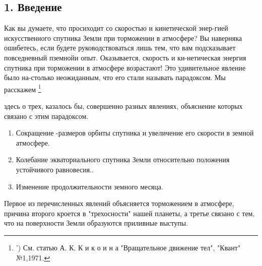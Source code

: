\fontsize{14}{9}\selectfont
\begin{multicols}{2}

\leftskip=0.1cm \rightskip=1cm
\fontsize{14}{15}\selectfont
\begin{minipage}{8.5cm}
\begin{center}
\subsection*{1. Введение}
\end{center}
 \hspace{10mm}Как вы думаете, что просиходит со скоростью и кинетической энер-гией искусственного спутника Земли при торможении в атмосфере? Вы наверняка ошибетесь, если будете руководствоваться лишь тем, что вам подсказывает повседневный пземнойи опыт. Оказывается, скорость и ки-нетическая энергия спутника при торможении в атмосфере возрастают! Это удивительное явление было на-столько неожиданным, что его стали называть парадоксом. Мы расскажем 
\footnote{') См. статью А. К. К и к о и н а "Вращательное движение тел", "Квант" №1,1971. }
\end{minipage}


\fontsize{14}{8}\selectfont
\leftskip=0.5cm \rightskip=0.7cm
\begin{minipage}{8.5cm}
здесь о трех, казалось бы, совершенно разных явлениях, объяснение которых связано с этим парадоксом.
 
\begin{enumerate}
 \item Сокращение -размеров орбиты спутника и увеличение его скорости в земной атмосфере.
 \item Колебание экваториального спутника Земли относительно положения устойчивого равновесия.. 
\item Изменение продолжительности земного месяца. 
 \end{enumerate}
 \hspace{10mm}Первое из перечисленных явлений объясняется торможением в атмосфере, причина второго кроется в "трехосности" нашей планеты, а третье связано с тем, что на поверхности Земли образуются приливные выступы. 
\end{minipage}
\end{multicols}

